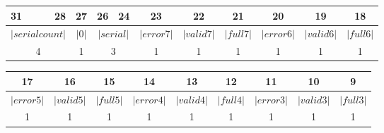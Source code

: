 \begin{center}
\begin{tabular}{p{5.5 ex}p{5.5 ex}p{2.4 ex}p{2.4 ex}p{3.0 ex}p{3.0 ex}p{3.0 ex}p{3.0 ex}p{3.0 ex}p{3.0 ex}p{2.5 ex}p{2.5 ex}p{3.0 ex}p{3.0 ex}p{3.0 ex}p{3.0 ex}p{2.5 ex}p{2.5 ex}}
{\scriptsize 31} &
\multicolumn{1}{r}{\scriptsize 28}
&
\multicolumn{2}{c}{\scriptsize 27}
&
{\scriptsize 26} &
\multicolumn{1}{r}{\scriptsize 24}
&
\multicolumn{2}{c}{\scriptsize 23}
&
\multicolumn{2}{c}{\scriptsize 22}
&
\multicolumn{2}{c}{\scriptsize 21}
&
\multicolumn{2}{c}{\scriptsize 20}
&
\multicolumn{2}{c}{\scriptsize 19}
&
\multicolumn{2}{c}{\scriptsize 18}
\\
         \hline
\multicolumn{2}{|c|}{$|serialcount|$}
&
\multicolumn{2}{c|}{$|0|$}
&
\multicolumn{2}{c|}{$|serial|$}
&
\multicolumn{2}{c|}{$|error7|$}
&
\multicolumn{2}{c|}{$|valid7|$}
&
\multicolumn{2}{c|}{$|full7|$}
&
\multicolumn{2}{c|}{$|error6|$}
&
\multicolumn{2}{c|}{$|valid6|$}
&
\multicolumn{2}{c|}{$|full6|$}
\\
         \hline
\multicolumn{2}{c}{\scriptsize 4} & \multicolumn{2}{c}{\scriptsize 1} & \multicolumn{2}{c}{\scriptsize 3} & \multicolumn{2}{c}{\scriptsize 1} & \multicolumn{2}{c}{\scriptsize 1} & \multicolumn{2}{c}{\scriptsize 1} & \multicolumn{2}{c}{\scriptsize 1} & \multicolumn{2}{c}{\scriptsize 1} & \multicolumn{2}{c}{\scriptsize 1}
\\
   \end{tabular}
\begin{tabular}{p{3.0 ex}p{3.0 ex}p{3.0 ex}p{3.0 ex}p{2.5 ex}p{2.5 ex}p{3.0 ex}p{3.0 ex}p{3.0 ex}p{3.0 ex}p{2.5 ex}p{2.5 ex}p{3.0 ex}p{3.0 ex}p{3.0 ex}p{3.0 ex}p{2.5 ex}p{2.5 ex}}
\multicolumn{2}{c}{\scriptsize 17}
&
\multicolumn{2}{c}{\scriptsize 16}
&
\multicolumn{2}{c}{\scriptsize 15}
&
\multicolumn{2}{c}{\scriptsize 14}
&
\multicolumn{2}{c}{\scriptsize 13}
&
\multicolumn{2}{c}{\scriptsize 12}
&
\multicolumn{2}{c}{\scriptsize 11}
&
\multicolumn{2}{c}{\scriptsize 10}
&
\multicolumn{2}{c}{\scriptsize 9}
\\
         \hline
\multicolumn{2}{|c|}{$|error5|$}
&
\multicolumn{2}{c|}{$|valid5|$}
&
\multicolumn{2}{c|}{$|full5|$}
&
\multicolumn{2}{c|}{$|error4|$}
&
\multicolumn{2}{c|}{$|valid4|$}
&
\multicolumn{2}{c|}{$|full4|$}
&
\multicolumn{2}{c|}{$|error3|$}
&
\multicolumn{2}{c|}{$|valid3|$}
&
\multicolumn{2}{c|}{$|full3|$}
\\
         \hline
\multicolumn{2}{c}{\scriptsize 1} & \multicolumn{2}{c}{\scriptsize 1} & \multicolumn{2}{c}{\scriptsize 1} & \multicolumn{2}{c}{\scriptsize 1} & \multicolumn{2}{c}{\scriptsize 1} & \multicolumn{2}{c}{\scriptsize 1} & \multicolumn{2}{c}{\scriptsize 1} & \multicolumn{2}{c}{\scriptsize 1} & \multicolumn{2}{c}{\scriptsize 1}

\end{tabular}
\end{center}
